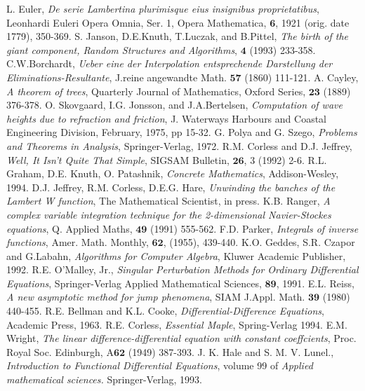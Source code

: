  \begin{thebibliography}{30}
L. Euler, \textit{De serie Lambertina plurimisque eius insignibus proprietatibus}, Leonhardi Euleri Opera Omnia, Ser. 1, Opera Mathematica, $\pmb{6}$, 1921 (orig. date 1779), 350-369. 
S. Janson, D.E.Knuth, T.Luczak, and B.Pittel, \textit{The birth of the giant component, Random Structures and Algorithms}, $\pmb{4}$ (1993) 233-358.
C.W.Borchardt, \textit{Ueber eine der Interpolation entsprechende Darstellung der Eliminations-Resultante}, J.reine angewandte Math. $\pmb{57}$ (1860) 111-121.
A. Cayley, \textit{A theorem of trees}, Quarterly Journal of Mathematics, Oxford Series, $\pmb{23}$ (1889) 376-378.
O. Skovgaard, I.G. Jonsson, and J.A.Bertelsen, \textit{Computation of wave heights due to refraction and friction}, J. Waterways Harbours and Coastal Engineering Division, February, 1975, pp 15-32.
G. Polya and G. Szego, \textit{Problems and Theorems in Analysis}, Springer-Verlag, 1972.
R.M. Corless and D.J. Jeffrey, \textit{Well, It Isn't Quite That Simple}, SIGSAM Bulletin, $\pmb{26}$, 3 (1992) 2-6.
R.L. Graham, D.E. Knuth, O. Patashnik, \textit{Concrete Mathematics}, Addison-Wesley, 1994.
D.J. Jeffrey, R.M. Corless, D.E.G. Hare, \textit{Unwinding the banches of the Lambert W function}, The Mathematical Scientist, in press.
K.B. Ranger, \textit{A complex variable integration technique for the 2-dimensional Navier-Stockes equations}, Q. Applied Maths, $\pmb{49}$ (1991) 555-562.
F.D. Parker, \textit{Integrals of inverse functions}, Amer. Math. Monthly, $\pmb{62}$, (1955), 439-440.
K.O. Geddes, S.R. Czapor and G.Labahn, \textit{Algorithms for Computer Algebra}, Kluwer Academic Publisher, 1992.
R.E. O'Malley, Jr., \textit{Singular Perturbation Methods for Ordinary Differential Equations}, Springer-Verlag Applied Mathematical Sciences, $\pmb{89}$, 1991.
E.L. Reiss, \textit{A new asymptotic method for jump phenomena}, SIAM J.Appl. Math. $\pmb{39}$ (1980) 440-455.
R.E. Bellman and K.L. Cooke, \textit{Differential-Difference Equations}, Academic Press, 1963.
R.E. Corless, \textit{Essential Maple}, Spring-Verlag 1994.
E.M. Wright, \textit{The linear difference-differential equation with constant coeffcients}, Proc. Royal Soc. Edinburgh, A$\pmb{62}$ (1949) 387-393.
J. K. Hale and S. M. V. Lunel., \textit{Introduction to Functional Differential Equations}, volume 99 of \textit{Applied mathematical sciences.} Springer-Verlag, 1993.

\end{thebibliography}
